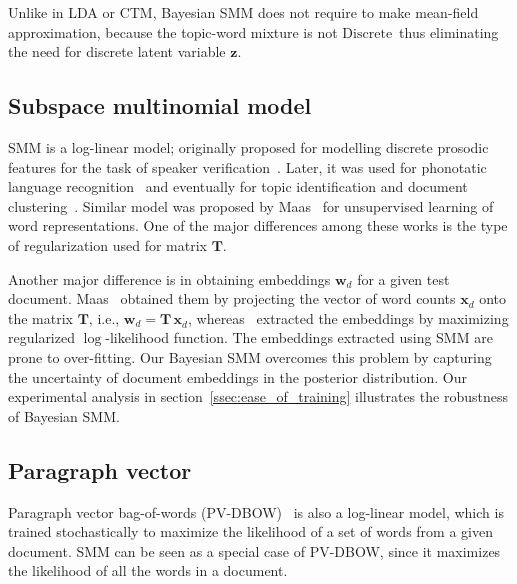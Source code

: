 \documentclass[journal]{IEEEtran}
\newcommand{\mb}[1]{\bm{#1}}
\newcommand{\Dis}{\(\mathrm{Discrete}\)}
\begin{document}
Unlike in LDA or CTM, Bayesian SMM does not require to make mean-field approximation, because the topic-word mixture is not \Dis~thus eliminating the need for discrete latent variable \(\mb{z}\).
\subsection{Subspace multinomial model}
\label{ssec_smm}
SMM is a log-linear model; originally proposed for modelling discrete prosodic 
features for the task of speaker verification~\cite{Marcel:2010:SMM}. Later, it 
was used for phonotatic language recognition~\cite{Mehdi:2011:SMM} and 
eventually for topic identification and document 
clustering~\cite{May:2015:mivec,Kesiraju:2016:SMM}. Similar model was proposed 
by Maas~\cite{Maas:2011:Sent} for unsupervised learning of word 
representations. One of the major differences among these works is the type of 
regularization used for matrix \(\mb{T}\).

Another major difference is in obtaining embeddings \(\mb{w}_d\) for a given test document. Maas~\cite{Maas:2011:Sent} obtained them by projecting the vector of word counts \(\mb{x}_d\) onto the matrix \(\mb{T}\), i.e., \(\mb{w}_d = \mb{T\,x}_d\), whereas~\cite{May:2015:mivec,Kesiraju:2016:SMM} extracted the embeddings by maximizing regularized \(\log\)-likelihood function.
The embeddings extracted using SMM are prone to over-fitting. Our Bayesian SMM 
overcomes this problem by capturing the uncertainty of document embeddings in 
the posterior distribution. Our experimental analysis in 
section~\ref{ssec:ease_of_training} illustrates the robustness of Bayesian SMM.

\subsection{Paragraph vector}
\label{ssec:pvec}
Paragraph vector bag-of-words (PV-DBOW)~\cite{Quoc:2014:PV} is also a 
log-linear model, which is trained stochastically to maximize the likelihood of 
a set of words from a given document. SMM can be seen as a special case of 
PV-DBOW, since it maximizes the likelihood of all the words in a document.
\end{document}
